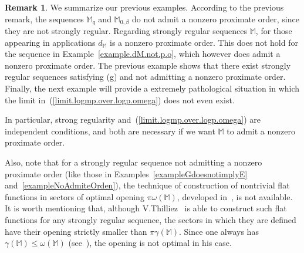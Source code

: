 \documentclass[11pt,a4paper]{article}
\theoremstyle{definition}
\newtheorem{rema}[theo]{Remark}
\def\b{\beta}
\def\o{\omega}
\def\ga{\gamma}
\def\M{\mathbb{M}}
\begin{document}
\begin{rema}
We summarize our previous examples. According to the previous remark, the sequences $\M_q$ and $\M_{0,\b}$ do not admit a nonzero proximate order, since they are not strongly regular. Regarding strongly regular sequences $\M$, for those appearing in applications $d_{\M}$ is a nonzero proximate order. This does not hold for the sequence in Example~\ref{example.dM.not.p.o}, which however does admit a nonzero proximate order. The previous example shows that there exist strongly  regular sequences satisfying (g) and not admitting a nonzero proximate order. Finally, the next example will provide a extremely pathological situation in which the limit in~(\ref{limit.logmp.over.logp.omega}) does not even exist.


In particular, strong regularity and~(\ref{limit.logmp.over.logp.omega}) are independent conditions, and both are necessary if we want $\M$ to admit a nonzero proximate order.

Also, note that for a strongly regular sequence not admitting a nonzero proximate order (like those in Examples~\ref{exampleGdoesnotimplyE} and~\ref{exampleNoAdmiteOrden}), the technique of construction of nontrivial flat functions in sectors of optimal opening $\pi\o(\M)$, developed in~\cite{SanzFlat}, is not available. It is worth mentioning that, although V.Thilliez~\cite{thilliez} is able to construct such flat functions for any strongly regular sequence, the sectors in which they are defined have their opening strictly smaller than $\pi\ga(\M)$. Since one always has $\ga(\M)\le \o(\M)$ (see~\cite[Prop.\ 3.7]{SanzFlat}), the opening is not optimal in his case.
\end{rema}
\end{document}

